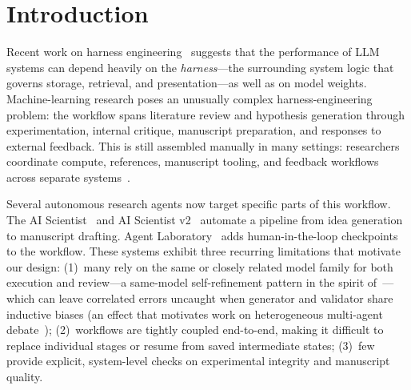 \section{Introduction}
\label{sec:intro}

Recent work on harness engineering~\citep{lee2026metaharness} suggests that the performance of LLM systems can depend heavily on the \emph{harness}---the surrounding system logic that governs storage, retrieval, and presentation---as well as on model weights.
Machine-learning research poses an unusually complex harness-engineering problem: the workflow spans literature review and hypothesis generation through experimentation, internal critique, manuscript preparation, and responses to external feedback.
This \CoreTerm{} is still assembled manually in many settings: researchers coordinate compute, references, manuscript tooling, and feedback workflows across separate systems~\citep{lu2024aiscientist,schmidgall2025agentrxiv}.

Several autonomous research agents now target specific parts of this workflow.
The AI Scientist~\citep{lu2024aiscientist} and AI Scientist v2~\citep{yamada2025aiscientistv2} automate a pipeline from idea generation to manuscript drafting.
Agent Laboratory~\citep{schmidgall2025agentrxiv}
adds human-in-the-loop checkpoints to the workflow.
These systems exhibit three recurring limitations that motivate our design:
(1)~many rely on the same or closely related model family for both execution and review---a same-model self-refinement pattern in the spirit of~\citet{madaan2023selfrefine,shinn2023reflexion}---which can leave correlated errors uncaught when generator and validator share inductive biases (an effect that motivates work on heterogeneous multi-agent debate~\citealp{du2024multiagentdebate,liang2024divergent});
(2)~workflows are tightly coupled end-to-end, making it difficult to replace individual stages or resume from saved intermediate states;
(3)~few provide explicit, system-level checks on experimental integrity and manuscript quality.


